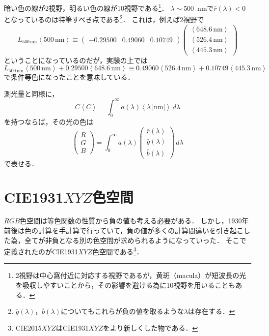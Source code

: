 \documentclass[uplatex,paper=a4,fontsize=4.0truemm,jafontsize=4.0truemm,head_space=30.0truemm,foot_space=30.0truemm,baselineskip=8.0truemm,line_length=40zw,gutter=25.0truemm,oneside,openany,fleqn,hanging_panctuation,open_bracket_pos=nibu_tentsuki,dvipdfmx,jis2004,book,titlepage]{jlreq}
\theoremstyle{mystyle}
\newcommand{\mathdisplaystyle}[1]{\(\displaystyle{#1}\)}
\newcommand{\negativevalue}[1]{{-#1}}
\newcommand{\parentheses}[1]{\left(#1\right)}
\newcommand{\anglebrackets}[1]{\left\langle#1\right\rangle}
\newcommand{\easymatrix}[1]{\mathord{\begin{pmatrix}#1\end{pmatrix}}}
\begin{document}
			暗い色の線が2\textdegree 視野，明るい色の線が10\textdegree 視野である\footnote{2\textdegree 視野は中心窩付近に対応する視野であるが，黄斑（macula）が短波長の光を吸収しやすいことから，その影響を避ける為に10\textdegree 視野を用いることもある．}．
			\mathdisplaystyle{\lambda\sim{}}\SI{500}{nm}で\mathdisplaystyle{\bar{r}\parentheses{\lambda}<0}となっているのは特筆すべき点である\footnote{\mathdisplaystyle{\bar{g}\parentheses{\lambda}}，\mathdisplaystyle{\bar{b}\parentheses{\lambda}}についてもこれらが負の値を取るような\mathdisplaystyle{\lambda}は存在する．}．
			これは，例えば2\textdegree 視野で
			\begin{equation*}
				L_{500\,\textrm{nm}}\anglebrackets{500\,\textrm{nm}}\equiv \easymatrix{\negativevalue{0.29500} & 0.49060 & 0.10749}\easymatrix{\anglebrackets{648.6\,\textrm{nm}} \\ \anglebrackets{526.4\,\textrm{nm}} \\ \anglebrackets{445.3\,\textrm{nm}}}
			\end{equation*}
			ということになっているのだが，実験の上では
			\begin{equation*}
				L_{500\,\textrm{nm}}\anglebrackets{500\,\textrm{nm}}+0.29500\anglebrackets{648.6\,\textrm{nm}}\equiv0.49060\anglebrackets{526.4\,\textrm{nm}}+0.10749\anglebrackets{445.3\,\textrm{nm}}
			\end{equation*}
			で条件等色になったことを意味している．

			測光量と同様に，
			\begin{equation*}
				C\anglebrackets{C}=\int_0^\infty{a\parentheses{\lambda}\anglebrackets{\lambda\,\textrm{[nm]}}}\,d\lambda
			\end{equation*}
			を持つならば，その光の色は
			\begin{equation*}
				\easymatrix{R \\ G \\ B}=\int_0^\infty{a\parentheses{\lambda}\easymatrix{\bar{r}\parentheses{\lambda} \\ \bar{g}\parentheses{\lambda} \\ \bar{b}\parentheses{\lambda}}}\,d\lambda
			\end{equation*}
			で表せる．
		\section{CIE1931\mathdisplaystyle{XYZ}色空間}
			\mathdisplaystyle{RGB}色空間は等色関数の性質から負の値も考える必要がある．
			しかし，1930年前後は色の計算を手計算で行っていて，負の値が多くの計算間違いを引き起こした為，全てが非負となる別の色空間が求められるようになっていった．
			そこで定義されたのがCIE1931\mathdisplaystyle{XYZ}色空間である\footnote{CIE2015\mathdisplaystyle{XYZ}はCIE1931\mathdisplaystyle{XYZ}をより新しくした物である．}．
\end{document}
